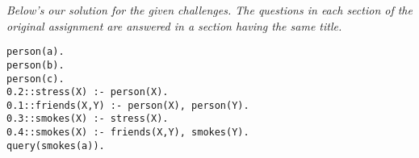 \documentclass{res/theme}
\subtitle{Michiel Janssen \& Bruno Vandekerkhove}
\begin{document}
\maketitle
\tableofcontents

\vspace{0.5cm}
\begin{center}
\end{center}

%
%
\begin{center}
\textit{Below's our solution for the given challenges. The questions in each section of the original assignment are answered in a section having the same title.}
\end{center}

\vspace{0.2cm}
\begin{code}
\begin{verbatim}
person(a). 
person(b). 
person(c). 
0.2::stress(X) :- person(X). 
0.1::friends(X,Y) :- person(X), person(Y). 
0.3::smokes(X) :- stress(X). 
0.4::smokes(X) :- friends(X,Y), smokes(Y). 
query(smokes(a)).
\end{verbatim}
\label{code:base}
\end{code}

\begin{center}
\end{center}

\begin{multicols*}{2}
\raggedcolumns

%
% 


%
% 


%
% 


\end{multicols*}

% 
%
%
%

%
%

%
\end{document}
